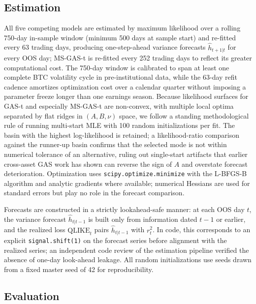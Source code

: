 \subsection{Estimation}

All five competing models are estimated by maximum likelihood over a rolling 750-day in-sample window (minimum 500 days at sample start) and re-fitted every 63 trading days, producing one-step-ahead variance forecasts $\hat h_{t+1|t}$ for every OOS day; MS-GAS-t is re-fitted every 252 trading days to reflect its greater computational cost. The 750-day window is calibrated to span at least one complete BTC volatility cycle in pre-institutional data, while the 63-day refit cadence amortizes optimization cost over a calendar quarter without imposing a parameter freeze longer than one earnings season. Because likelihood surfaces for GAS-t and especially MS-GAS-t are non-convex, with multiple local optima separated by flat ridges in $(A, B, \nu)$ space, we follow a standing methodological rule of running multi-start MLE with 100 random initializations per fit. The basin with the highest log-likelihood is retained; a likelihood-ratio comparison against the runner-up basin confirms that the selected mode is not within numerical tolerance of an alternative, ruling out single-start artifacts that earlier cross-asset GAS work has shown can reverse the sign of $A$ and overstate forecast deterioration. Optimization uses \texttt{scipy.optimize.minimize} with the L-BFGS-B algorithm and analytic gradients where available; numerical Hessians are used for standard errors but play no role in the forecast comparison.

Forecasts are constructed in a strictly lookahead-safe manner: at each OOS day $t$, the variance forecast $\hat h_{t|t-1}$ is built only from information dated $t-1$ or earlier, and the realized loss $\mathrm{QLIKE}_t$ pairs $\hat h_{t|t-1}$ with $r_t^2$. In code, this corresponds to an explicit \texttt{signal.shift(1)} on the forecast series before alignment with the realized series; an independent code review of the estimation pipeline verified the absence of one-day look-ahead leakage. All random initializations use seeds drawn from a fixed master seed of 42 for reproducibility.

\subsection{Evaluation}

